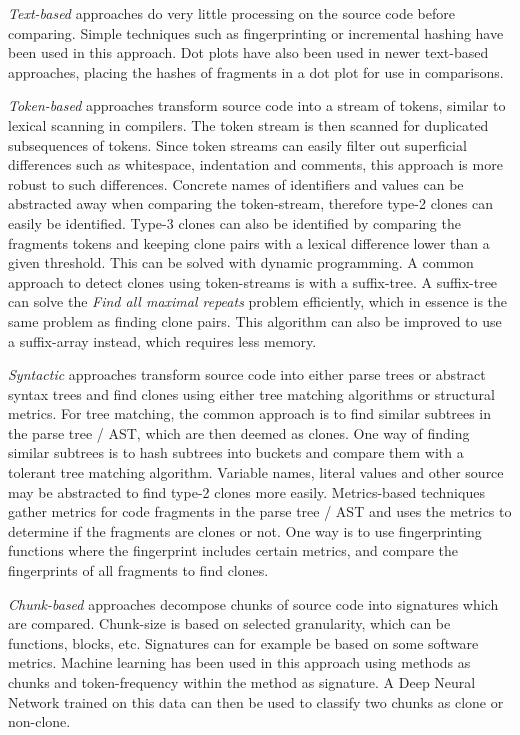 \documentclass[12pt]{article}
\begin{document}
\textit{Text-based} approaches do very little processing on the source code before
comparing. Simple techniques such as fingerprinting or incremental hashing have been used
in this approach. Dot plots have also been used in newer text-based approaches, placing
the hashes of fragments in a dot plot for use in comparisons.

\textit{Token-based} approaches transform source code into a stream of tokens, similar to
lexical scanning in compilers. The token stream is then scanned for duplicated
subsequences of tokens. Since token streams can easily filter out superficial differences
such as whitespace, indentation and comments, this approach is more robust to such
differences. Concrete names of identifiers and values can be abstracted away when comparing
the token-stream, therefore type-2 clones can easily be identified. Type-3 clones can also
be identified by comparing the fragments tokens and keeping clone pairs with a lexical
difference lower than a given threshold. This can be solved with dynamic
programming\cite{BakerSparseDynamicProgramming}. A common approach to detect clones using
token-streams is with a suffix-tree. A suffix-tree can solve the \textit{Find all maximal
repeats} problem efficiently, which in essence is the same problem as finding clone pairs.
This algorithm can also be improved to use a suffix-array instead, which requires less
memory.

\textit{Syntactic} approaches transform source code into either parse trees or abstract
syntax trees and find clones using either tree matching algorithms or structural metrics.
For tree matching, the common approach is to find similar subtrees in the parse tree /
AST, which are then deemed as clones. One way of finding similar subtrees is to hash
subtrees into buckets and compare them with a tolerant tree matching algorithm. Variable
names, literal values and other source may be abstracted to find type-2 clones more
easily. Metrics-based techniques gather metrics for code fragments in the parse tree / AST
and uses the metrics to determine if the fragments are clones or not. One way is to use
fingerprinting functions where the fingerprint includes certain metrics, and compare the
fingerprints of all fragments to find clones.

\textit{Chunk-based} approaches decompose chunks of source code into signatures which are
compared. Chunk-size is based on selected granularity, which can be functions, blocks,
etc. Signatures can for example be based on some software metrics. Machine learning has
been used in this approach using methods as chunks and token-frequency within the method
as signature. A Deep Neural Network trained on this data can then be used to classify two
chunks as clone or non-clone.
\end{document}
